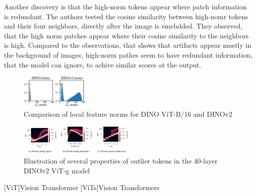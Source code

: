 \documentclass[conference]{IEEEtran}
\begin{document}
Another discovery is that the high-norm tokens appear where patch information is redundant. The authors tested the cosine similarity between high-nomr tokens and their four neighbors, directly after the image is emebdded. They observed, that the high norm patches appear where their cosine similarity to the neighbors is high. Compared to the observations, that shows that artifacts appear mostly in the background of images, high-norm pathes seem to have redundant information, that the model can ignore, to achive similar scores at the output. 


\begin{figure}
    \centering
    \includegraphics[width=0.3\textwidth]{artifact-norm.png}
    \caption{Comparison of local feature norms for DINO ViT-B/16 and DINOv2 \cite{registers}}
    \label{fig:artifacts-norm}
\end{figure}

\begin{figure}
    \centering
    \includegraphics[width=0.5\textwidth]{artifact-layers.png}
    \caption{Illustration of several properties of outlier tokens in the 40-layer DINOv2 ViT-g model \cite{registers}}
    \label{fig:artifacts-layer}
\end{figure}

\printbibliography


\begin{acronym}
	[ViT]{Vision Transformer}
    [ViTs]{Vision Transformers}
\end{acronym}




\end{document}

